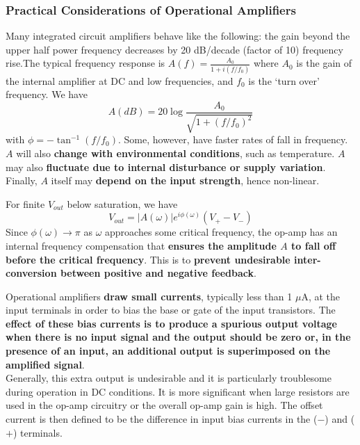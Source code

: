 \documentclass[a4paper]{article}
\begin{document}
\subsubsection*{Practical Considerations of Operational Amplifiers~\cite{ahmed_spreadbury_1984,10.5555/2960712}}
\begin{Note}
Many integrated circuit amplifiers behave like the following: the gain beyond the upper half power frequency decreases by 20 dB/decade (factor of 10) frequency rise.The typical frequency response is $A(f)=\frac{A_0}{1+i(f/f_0)}$ where $A_0$ is the gain of the internal amplifier at DC and low frequencies, and $f_0$ is the `turn over' frequency. We have 
$$A (dB)=20\log\frac{A_0}{\sqrt{1+(f/f_0)^2}}$$
with $\phi=-\tan^{-1}(f/f_0)$. Some, however, have faster rates of fall in frequency.\\[5pt]
$A$ will also \textbf{change with environmental conditions}, such as temperature. $A$ may also \textbf{fluctuate due to internal disturbance or supply variation}. Finally, $A$ itself may \textbf{depend on the input strength}, hence non-linear.
\end{Note}
\begin{Note}
For finite $V_{out}$ below saturation, we have
$$V_{out}=|A(\omega)|e^{i\phi(\omega)}(V_+-V_-)$$
Since $\phi(\omega)\rightarrow\pi$ as $\omega$ approaches some critical frequency, the op-amp has an internal frequency compensation that \textbf{ensures the amplitude $A$ to fall off before the critical frequency}. This is to \textbf{prevent undesirable inter-conversion between positive and negative feedback}.
\end{Note}
\begin{Note}
Operational amplifiers \textbf{draw small currents}, typically less than 1 $\mu$A, at the input terminals in order to bias the base or gate of the input transistors. The \textbf{effect of these bias currents is to produce a spurious output voltage when there is no input signal and the output should be zero or, in the presence of an input, an additional output is superimposed on the amplified signal}.\\[5pt]
Generally, this extra output is undesirable and it is particularly troublesome during operation in DC conditions. It is more significant when large resistors are used in the op-amp circuitry or the overall op-amp gain is high. The offset current is then defined to be the difference in input bias currents in the ($-$) and ($+$) terminals.
\end{Note}
\end{document}

